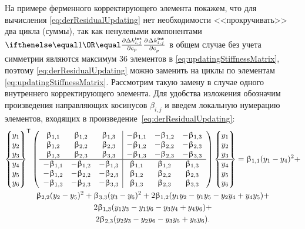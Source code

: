 На примере ферменного корректирующего элемента покажем, что для вычисления \eqref{eq:derResidualUpdating} нет необходимости <<прокручивать>> два цикла (суммы), так как ненулевыми компонентами $ \partDer{\Delta \internal{k}_{i, j}}{c_p}{} $ в общем случае без учета симметрии являются максимум 36 элементов в \eqref{eq:updatingStiffnessMatrix}, поэтому \eqref{eq:derResidualUpdating} можно заменить на циклы по элементам \eqref{eq:updatingStiffnessMatrix}. Рассмотрим такую замену в случае одного внутреннего корректирующего элемента. Для удобства изложения обозначим произведения направляющих косинусов $ \beta_{i, j} $ и введем локальную нумерацию элементов, входящих в произведение~\eqref{eq:derResidualUpdating}:
\begin{gather}
	\trans{
	\begin{Bmatrix}
		y_1 \\
		y_2 \\
		y_3 \\
		\hline
		y_4 \\
		y_5 \\
		y_6 
	\end{Bmatrix}}
	\left(
	\begin{array}{c c c | c c c}
		\beta_{1, 1} & \beta_{1, 2} & \beta_{1, 3} & -\beta_{1, 1} & -\beta_{1, 2} & -\beta_{1, 3} \\
		\beta_{1, 2} & \beta_{2, 2} & \beta_{2, 3} & -\beta_{1, 2} & -\beta_{2, 2} & -\beta_{2, 3} \\
		\beta_{1, 3} & \beta_{2, 3} & \beta_{3, 3} & -\beta_{1, 3} & -\beta_{2, 3} & -\beta_{3, 3} \\
		\hline
		-\beta_{1, 1} & -\beta_{1, 2} & -\beta_{1, 3} & \beta_{1, 1} & \beta_{1, 2} & \beta_{1, 3} \\
		-\beta_{1, 2} & -\beta_{2, 2} & -\beta_{2, 3} & \beta_{1, 2} & \beta_{2, 2} & \beta_{2, 3} \\
		-\beta_{1, 3} & -\beta_{2, 3} & -\beta_{3, 3} & \beta_{1, 3} & \beta_{2, 3} & \beta_{3, 3}
	\end{array}
	\right)
	\begin{Bmatrix}
		y_1 \\
		y_2 \\
		y_3 \\
		\hline
		y_4 \\
		y_5 \\
		y_6 
	\end{Bmatrix} = \beta_{1, 1} (y_1 - y_4) ^ 2 + \nonumber \\
	\beta_{2, 2} (y_2 - y_5) ^ 2 + \beta_{3, 3} (y_3 - y_6) ^ 2 + 2 \beta_{1, 2} (y_1 y_2 - y_1 y_5 - y_2 y_4 + y_4 y_5) + \nonumber \\
	2 \beta_{1, 3} (y_1 y_3 - y_1 y_6 - y_3 y_4 + y_4 y_6) + \nonumber \\
	2 \beta_{2, 3} (y_2 y_3 - y_2 y_6 - y_3 y_5 + y_5 y_6).
	\label{eq:schemeDerFull}
\end{gather}
 
